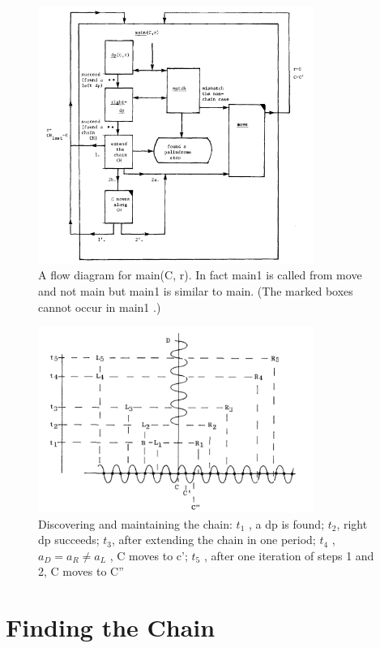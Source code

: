 \documentclass[11pt,a4paper]{report}
\begin{document}
\begin{figure}[h]
    \centerline{\includegraphics[width=0.8\textwidth]{./images/2.png}}
    \caption{A flow diagram for main(C, r). In fact main1 is called from move and not main but main1
    is similar to main. (The marked boxes cannot occur in main1 .) }
    \label{fig}
\end{figure}
\begin{figure}[h]
    \centerline{\includegraphics[width=0.8\textwidth]{./images/3.png}}
    \caption{Discovering and maintaining the chain: $t_1$ , a dp is found; $t_2$, right dp succeeds;
    $t_3 $, after extending the chain in one period; $t_4$ , $a_D = a_R \neq a_L$ , C moves to c’; $t_5$ , after one iteration
    of steps 1 and 2, C moves to C”}
    \label{fig}
\end{figure}

\chapter{Finding the Chain}
\end{document}
